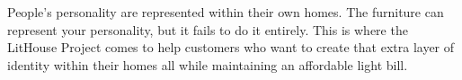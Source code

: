 People's personality are represented within their own homes. The furniture can represent your personality, but it fails to do it entirely. This is where the LitHouse Project comes to help customers who want to create that
extra layer of identity within their homes all while maintaining an affordable light bill. 